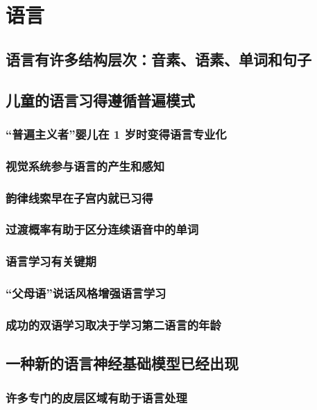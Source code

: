\chapter{语言}

\section{语言有许多结构层次：音素、语素、单词和句子}

\section{儿童的语言习得遵循普遍模式}
\subsection{“普遍主义者”婴儿在 1 岁时变得语言专业化}
\subsection{视觉系统参与语言的产生和感知}
\subsection{韵律线索早在子宫内就已习得}
\subsection{过渡概率有助于区分连续语音中的单词}
\subsection{语言学习有关键期}
\subsection{“父母语”说话风格增强语言学习}
\subsection{成功的双语学习取决于学习第二语言的年龄}

\section{一种新的语言神经基础模型已经出现}
\subsection{许多专门的皮层区域有助于语言处理}
